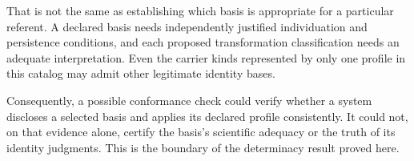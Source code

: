 That is not the same as establishing which basis is appropriate for
a particular referent.
A declared basis needs independently justified
individuation and persistence conditions, and each proposed
transformation classification needs an adequate interpretation.
Even the carrier kinds represented by only one profile in this
catalog may admit other legitimate identity bases.

Consequently, a possible conformance check could verify whether a
system discloses a selected basis and applies its declared profile
consistently.
It could not, on that evidence alone, certify the
basis's scientific adequacy or the truth of its identity judgments.
This is the boundary of the determinacy result proved here.
